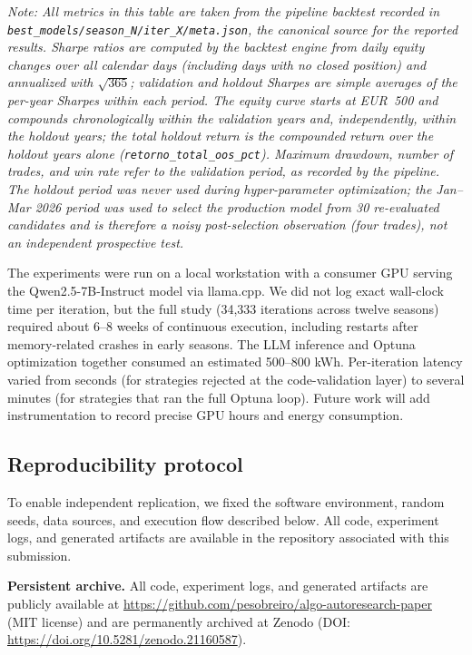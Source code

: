 \documentclass[analytics,article,submit,pdftex,moreauthors]{Definitions/mdpi}
\begin{document}
\emph{Note: All metrics in this table are taken from the pipeline backtest recorded in \texttt{best\_models/season\_N/iter\_X/meta.json}, the canonical source for the reported results. Sharpe ratios are computed by the backtest engine from daily equity changes over all calendar days (including days with no closed position) and annualized with $\sqrt{365}$; validation and holdout Sharpes are simple averages of the per-year Sharpes within each period. The equity curve starts at EUR~500 and compounds chronologically within the validation years and, independently, within the holdout years; the total holdout return is the compounded return over the holdout years alone (\texttt{retorno\_total\_oos\_pct}). Maximum drawdown, number of trades, and win rate refer to the validation period, as recorded by the pipeline. The holdout period was never used during hyper-parameter optimization; the Jan--Mar 2026 period was used to select the production model from 30 re-evaluated candidates and is therefore a noisy post-selection observation (four trades), not an independent prospective test.}

The experiments were run on a local workstation with a consumer GPU serving the Qwen2.5-7B-Instruct model via llama.cpp. We did not log exact wall-clock time per iteration, but the full study (34,333 iterations across twelve seasons) required about 6--8 weeks of continuous execution, including restarts after memory-related crashes in early seasons. The LLM inference and Optuna optimization together consumed an estimated 500--800 kWh. Per-iteration latency varied from seconds (for strategies rejected at the code-validation layer) to several minutes (for strategies that ran the full Optuna loop). Future work will add instrumentation to record precise GPU hours and energy consumption.

\subsection{Reproducibility protocol}\label{reproducibility-protocol}

To enable independent replication, we fixed the software environment, random seeds, data sources, and execution flow described below. All code, experiment logs, and generated artifacts are available in the repository associated with this submission.

\textbf{Persistent archive.} All code, experiment logs, and generated artifacts are publicly available at \url{https://github.com/pesobreiro/algo-autoresearch-paper} (MIT license) and are permanently archived at Zenodo (DOI: \url{https://doi.org/10.5281/zenodo.21160587}).
\end{document}
